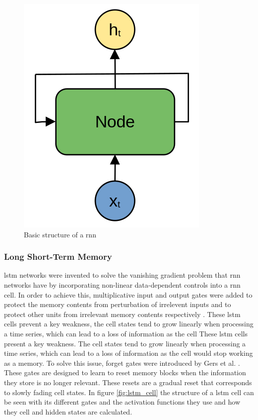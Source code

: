\begin{figure}[h]
    \centering
    \includegraphics[scale=0.20]{images/rnn_basic.png}
    \caption{Basic structure of a \acrshort{rnn}}
    \label{fig:rnn_basic}
\end{figure}

\subsubsection{Long Short-Term Memory}
\acrfull{lstm} networks were invented to solve the vanishing gradient problem that \acrshort{rnn} networks have by incorporating non-linear data-dependent controls 
into a \acrshort{rnn} cell. In order to achieve this, multiplicative input and output gates were added to protect the memory contents from perturbation of irrelevent inputs
and to protect other units from irrelevant memory contents respectively \cite{LSTMoriginal}.
These \acrshort{lstm} cells prevent a key weakness, the cell states tend to grow linearly when processing a time series, which can lead to a loss of information as the cell
These \acrshort{lstm} cells present a key weakness. The cell states tend to grow linearly when processing a time series, which can lead to a loss of information as the cell
would stop working as a memory. To solve this issue, forget gates were introduced by Gers et al. \cite{LSTMforget}. These gates are designed to learn to reset memory blocks
when the information they store is no longer relevant. These resets are a gradual reset that corresponds to slowly fading cell states.
In figure \ref{fig:lstm_cell} the structure of a \acrshort{lstm} cell can be seen with its different gates and the activation functions they use and how they cell and hidden states
are calculated.

